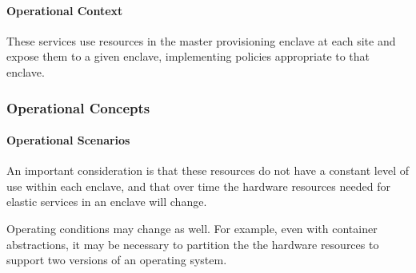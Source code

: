 \paragraph{Operational Context}

These services use resources in the master provisioning enclave at each site and expose them
to a given enclave, implementing policies appropriate to that enclave.

\subsubsection{Operational Concepts}

\paragraph{Operational Scenarios}

An important consideration is that these resources do not have a constant
level of use within each enclave, and that over time the hardware resources
needed for elastic services in an enclave will change.

Operating conditions may change as well. For example, even with container
abstractions, it may be necessary to partition the the hardware resources  to
support two versions of an operating system.

